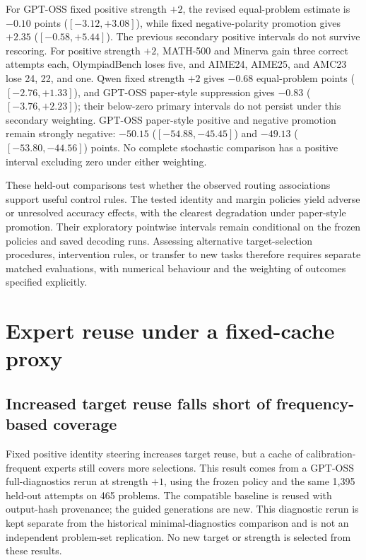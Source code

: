 \documentclass[12pt,a4paper,twoside,openright]{book}
\begin{document}
For GPT-OSS fixed positive strength $+2$, the revised equal-problem
estimate is $-0.10$ points ($[-3.12,+3.08]$), while fixed negative-polarity
promotion gives $+2.35$ ($[-0.58,+5.44]$). The previous secondary
positive intervals do not survive rescoring. For positive strength $+2$,
MATH-500 and Minerva gain three correct attempts each, OlympiadBench
loses five, and AIME24, AIME25, and AMC23 lose 24, 22, and one.
Qwen fixed strength $+2$ gives $-0.68$ equal-problem points
($[-2.76,+1.33]$), and GPT-OSS paper-style suppression gives $-0.83$
($[-3.76,+2.23]$); their below-zero primary intervals do not persist
under this secondary weighting. GPT-OSS paper-style positive and negative
promotion remain strongly negative: $-50.15$ ($[-54.88,-45.45]$) and
$-49.13$ ($[-53.80,-44.56]$) points. No complete stochastic comparison
has a positive interval excluding zero under either weighting.

These held-out comparisons test whether the observed routing associations
support useful control rules. The tested identity and margin policies yield
adverse or unresolved accuracy effects, with the clearest degradation under
paper-style promotion. Their exploratory pointwise intervals remain
conditional on the frozen policies and saved decoding runs. Assessing
alternative target-selection procedures, intervention rules, or transfer to
new tasks therefore requires separate matched evaluations, with numerical
behaviour and the weighting of outcomes specified explicitly.

\section{Expert reuse under a fixed-cache proxy}

\subsection{Increased target reuse falls short of frequency-based coverage}
\label{sec:oss-cache-diagnostics}

Fixed positive identity steering increases target reuse, but a cache of
calibration-frequent experts still covers more selections. This result comes
from a GPT-OSS full-diagnostics rerun at strength $+1$, using the frozen
policy and the same 1,395 held-out attempts on 465 problems. The compatible
baseline is reused with output-hash provenance; the guided generations are
new. This diagnostic rerun is kept separate from the historical
minimal-diagnostics comparison and is not an independent problem-set
replication. No new target or strength is selected from these results.
\end{document}
